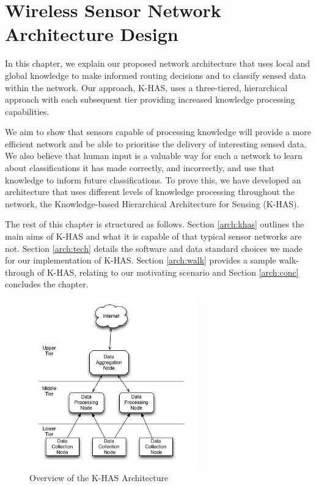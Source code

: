 \chapter{Wireless Sensor Network Architecture Design}\label{chap:arch}
	In this chapter, we explain our proposed network architecture that uses local and global knowledge to make informed routing decisions and to classify sensed data within the network. Our approach, K-HAS, uses a three-tiered, hierarchical approach with each subsequent tier providing increased knowledge processing capabilities. 

	We aim to show that sensors capable of processing knowledge will provide a more efficient network and be able to prioritise the delivery of interesting sensed data. We also believe that human input is a valuable way for such a network to learn about classifications it has made correctly, and incorrectly, and use that knowledge to inform future classifications. To prove this, we have developed an architecture that uses different levels of knowledge processing throughout the network, the Knowledge-based Hierarchical Architecture for Sensing (K-HAS).

	The rest of this chapter is structured as follows. Section \ref{arch:khas} outlines the main aims of K-HAS and what it is capable of that typical sensor networks are not. Section \ref{arch:tech} details the software and data standard choices we made for our implementation of K-HAS. Section \ref{arch:walk} provides a sample walk-through of K-HAS, relating to our motivating scenario and Section \ref{arch:conc} concludes the chapter.

	\begin{figure}[h]
			\centering
			\includegraphics[width=0.65\textwidth]{Chap4/figures/khasarch} 
			\caption{Overview of the K-HAS Architecture}
			\label{arch:khas:arch}
			\end{figure}


